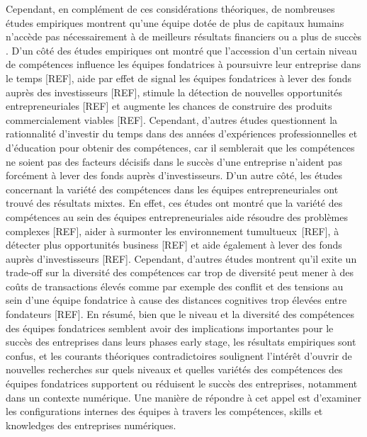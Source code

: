 \documentclass[12pt]{article}
\begin{document}
Cependant, en complément de ces considérations théoriques, de nombreuses études empiriques montrent qu'une équipe dotée de plus de capitaux humains n'accède pas nécessairement à de meilleurs résultats financiers ou a plus de succès \citep{pierce2013too}. D'un côté des études empiriques ont montré que l'accession d'un certain niveau de compétences influence les équipes fondatrices à poursuivre leur entreprise dans le temps [REF], aide par effet de signal les équipes fondatrices à lever des fonds auprès des investisseurs [REF], stimule la détection de nouvelles opportunités entrepreneuriales [REF] et augmente les chances de construire des produits commercialement viables [REF]. Cependant, d'autres études questionnent la rationnalité d'investir du temps dans des années d'expériences professionnelles et d'éducation pour obtenir des compétences, car il semblerait que les compétences ne soient pas des facteurs décisifs dans le succès d'une entreprise n'aident pas forcément à lever des fonds auprès d'investisseurs. D'un autre côté, les études concernant la variété des compétences dans les équipes entrepreneuriales ont trouvé des résultats mixtes. En effet, ces études ont montré que la variété des compétences au sein des équipes entrepreneuriales aide résoudre des problèmes complexes [REF], aider à surmonter les environnement tumultueux [REF], à détecter plus opportunités business [REF] et aide également à lever des fonds auprès d'investisseurs [REF]. Cependant, d'autres études montrent qu'il exite un trade-off sur la diversité des compétences car trop de diversité peut mener à des coûts de transactions élevés comme par exemple des conflit et des tensions au sein d'une équipe fondatrice à cause des distances cognitives trop élevées entre fondateurs [REF]. En résumé, bien que le niveau et la diversité des compétences des équipes fondatrices semblent avoir des implications importantes pour le succès des entreprises dans leurs phases early stage, les résultats empiriques sont confus, et les courants théoriques contradictoires soulignent l'intérêt d'ouvrir de nouvelles recherches sur quels niveaux et quelles variétés des compétences des équipes fondatrices supportent ou réduisent le succès des entreprises, notamment dans un contexte numérique. Une manière de répondre à cet appel est d'examiner les configurations internes des équipes à travers les compétences, skills et knowledges des entreprises numériques.
\end{document}
